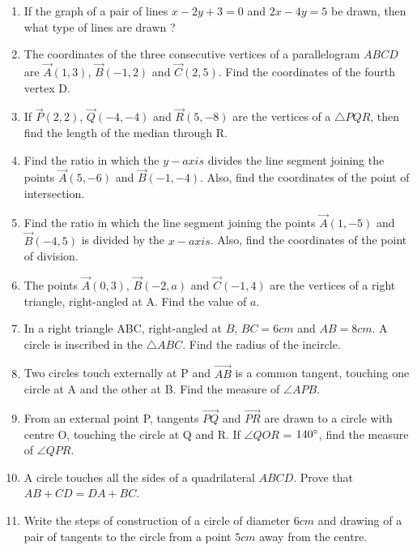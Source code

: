 \documentclass{article}
\begin{document}
\begin{enumerate}
\item If the graph of a pair of lines $x - 2y + 3 = 0$ and $2x - 4y = 5$ be drawn, then what type of lines are drawn ? 
  
\item The coordinates of the three consecutive vertices of a parallelogram $ABCD$ are $\vec{A}(1, 3)$, $\vec{B}(-1, 2)$ and $\vec{C}(2, 5)$. Find the coordinates of the fourth vertex D. 

\item If $\vec{P}(2, 2)$, $\vec{Q}(-4, -4)$ and $\vec{R}(5, -8)$ are the vertices of a $\triangle PQR$, then find the length of the median through R.

\item Find the ratio in which the $y-axis$ divides the line segment joining the points $\vec{A}(5, -6)$ and $\vec{B}(-1, -4)$. Also, find the coordinates of the point of intersection.

\item Find the ratio in which the line segment joining the points $\vec{A}(1, -5)$ and $\vec{B}(-4, 5)$ is divided by the $x-axis$. Also, find the coordinates of the point of division.
   
\item The points $\vec{A}(0, 3)$, $\vec{B}(-2, a)$ and $\vec{C}(-1, 4)$ are the vertices of a right triangle, right-angled at A. Find the value of $a$. 
		
\item In a right triangle ABC, right-angled at $B$, $BC = 6 cm$ and $AB = 8 cm$. A circle is inscribed in the $\triangle ABC$. Find the radius of the incircle. 
			
\item Two circles touch externally at P and $ \vec{AB} $ is a common tangent, touching one circle at A and the other at B. Find the measure of $\angle APB$.

\item From an external point P, tangents $ \vec{PQ} $ and $ \vec{PR} $ are drawn to a circle with centre O, touching the circle at Q and R. If $\angle QOR$ = $140\degree$, find the measure of $\angle QPR$. 

\item A circle touches all the sides of a quadrilateral $ABCD$. Prove that $AB + CD = DA + BC$.

\item Write the steps of construction of a circle of diameter $6 cm$ and drawing of a pair of tangents to the circle from a point $5 cm$ away from the centre. 
		
\end{enumerate}	
\end{document}
